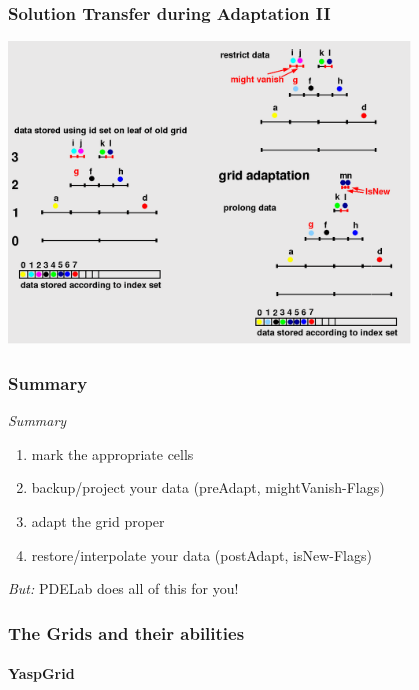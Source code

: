 \begin{frame}
  \frametitle{Solution Transfer during Adaptation II}  

  \begin{center}
    \includegraphics[width=0.8\textwidth]{EPS/adaptivity/hadapt1}
  \end{center}

\end{frame}

\begin{frame}
  \frametitle<presentation>{Summary}
  \begin{block}{\emph{Summary}}
    \begin{enumerate}
      \item mark the appropriate cells
      \item backup/project your data (preAdapt, mightVanish-Flags)
      \item adapt the grid proper
      \item restore/interpolate your data (postAdapt, isNew-Flags)
    \end{enumerate}
  \end{block}
  \pause
  \begin{block}{\emph{But:}}
    PDELab does all of this for you!
  \end{block}
\end{frame}

\subsubsection*{The Grids and their abilities}

\paragraph{YaspGrid}

